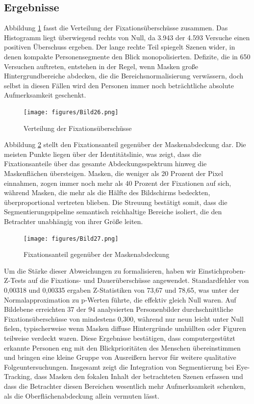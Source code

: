 \documentclass[
    language=german, %
    thesis=seminar, %
    supervisor=postdoc, %
    multiauthor=true, %
    ]{settings/csssa-thesis}
\begin{document}
\subsection{Ergebnisse}
Abbildung \ref{fig:bild21} fasst die Verteilung der Fixationsüberschüsse zusammen. Das Histogramm liegt überwiegend rechts von Null, 
da 3.943 der 4.593 Versuche einen positiven Überschuss ergeben. Der lange rechte Teil spiegelt Szenen wider, 
in denen kompakte Personensegmente den Blick monopolisierten. Defizite, die in 650 Versuchen auftreten, 
entstehen in der Regel, wenn Masken große Hintergrundbereiche abdecken, die die Bereichsnormalisierung verwässern, 
doch selbst in diesen Fällen wird den Personen immer noch beträchtliche absolute Aufmerksamkeit geschenkt.

\begin{figure}[h]
    \centering
    \texttt{[image: figures/Bild26.png]}
    \caption{Verteilung der Fixationsüberschüsse }\label{fig:bild21}
\end{figure}

Abbildung \ref{fig:bild22} stellt den Fixationsanteil gegenüber der Maskenabdeckung dar. Die meisten Punkte liegen über der Identitätslinie, 
was zeigt, dass die Fixationsanteile über das gesamte Abdeckungsspektrum hinweg die Maskenflächen übersteigen. Masken, 
die weniger als 20 Prozent der Pixel einnahmen, zogen immer noch mehr als 40 Prozent der Fixationen auf sich, während Masken, 
die mehr als die Hälfte des Bildschirms bedeckten, überproportional vertreten blieben. Die Streuung bestätigt somit, 
dass die Segmentierungspipeline semantisch reichhaltige Bereiche isoliert, die den Betrachter unabhängig von ihrer Größe leiten.

\begin{figure}[h]
    \centering
    \texttt{[image: figures/Bild27.png]}
    \caption{Fixationsanteil gegenüber der Maskenabdeckung}\label{fig:bild22}
\end{figure}

Um die Stärke dieser Abweichungen zu formalisieren, haben wir Einstichproben-Z-Tests auf die Fixations- 
und Dauerüberschüsse angewendet. Standardfehler von 0,00318 und 0,00335 ergaben Z-Statistiken von 
73,67 und 78,65, was unter der Normalapproximation zu p-Werten führte, die effektiv gleich Null waren. 
Auf Bildebene erreichten 37 der 94 analysierten Personenbilder durchschnittliche Fixationsüberschüsse von 
mindestens 0,300, während nur neun leicht unter Null fielen, typischerweise wenn Masken diffuse Hintergründe 
umhüllten oder Figuren teilweise verdeckt waren. Diese Ergebnisse bestätigen, dass computergestützt 
erkannte Personen eng mit den Blickprioritäten des Menschen übereinstimmen und bringen eine kleine 
Gruppe von Ausreißern hervor für weitere qualitative Folgeuntersuchungen. Insgesamt zeigt die 
Integration von Segmentierung bei Eye-Tracking, dass Masken den fokalen Inhalt der betrachteten 
Szenen erfassen und dass die Betrachter diesen Bereichen wesentlich mehr Aufmerksamkeit schenken, als die 
Oberflächenabdeckung allein vermuten lässt.
\end{document}
